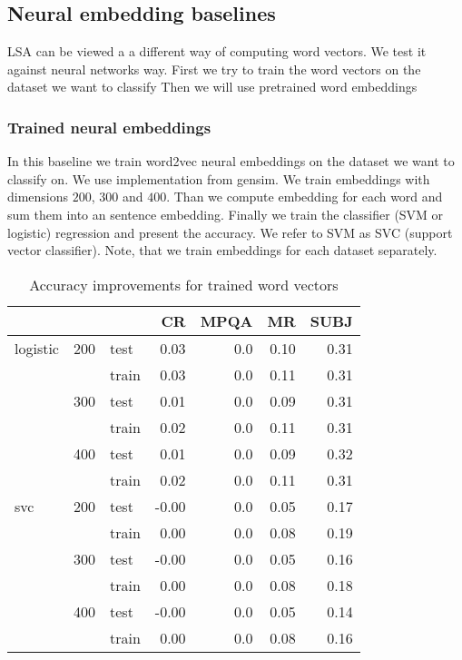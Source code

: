     
    \* %

    \subsection{Neural embedding baselines}
    \* %
    LSA can be viewed a a different way of computing word vectors.
    We test it against neural networks way.
    First we try to train the word vectors on the dataset we want to classify
    Then we will use pretrained word embeddings
    
    \subsubsection{Trained neural embeddings}
    In this baseline we train word2vec neural embeddings on the dataset we want to classify on. 
    We use implementation  from gensim.
    We train embeddings with dimensions $200$, $300$ and $400$. 
    Than we compute embedding for each word and sum them into an sentence embedding.
    Finally we train the classifier (SVM or logistic) regression and present the accuracy.
    We refer to SVM as SVC (support vector classifier).
    Note, that we train embeddings for each dataset separately.

    \begin{table}[H]
    \begin{center}
    
    \begin{tabular}{lllrrrr}
    \toprule
     & &&CR &MPQA &MR &SUBJ \\
    \midrule
    logistic & 200 & test & 0.03 &0.0 & 0.10 & 0.31 \\
     & & train & 0.03 &0.0 & 0.11 & 0.31 \\
     & 300 & test & 0.01 &0.0 & 0.09 & 0.31 \\
     & & train & 0.02 &0.0 & 0.11 & 0.31 \\
     & 400 & test & 0.01 &0.0 & 0.09 & 0.32 \\
     & & train & 0.02 &0.0 & 0.11 & 0.31 \\
    svc & 200 & test &-0.00 &0.0 & 0.05 & 0.17 \\
     & & train & 0.00 &0.0 & 0.08 & 0.19 \\
     & 300 & test &-0.00 &0.0 & 0.05 & 0.16 \\
     & & train & 0.00 &0.0 & 0.08 & 0.18 \\
     & 400 & test &-0.00 &0.0 & 0.05 & 0.14 \\
     & & train & 0.00 &0.0 & 0.08 & 0.16 \\
    \bottomrule
    \end{tabular}
    
    
    \caption[Accuracy improvements for trained word vectors]{Accuracy improvements for trained word vectors}
    \label{tab:res:trainedwordvec}
    \end{center}
    \end{table}

